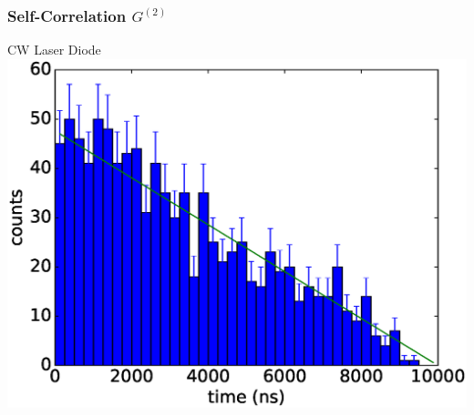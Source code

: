 \begin{frame}\frametitle{Self-Correlation $G^{(2)}$}
  \begin{center}
  CW Laser Diode
    \includegraphics[width=\textwidth]{images/g2_cw_source/g2_cw_binsize_250ns.eps}
    \end{center}
\end{frame}

